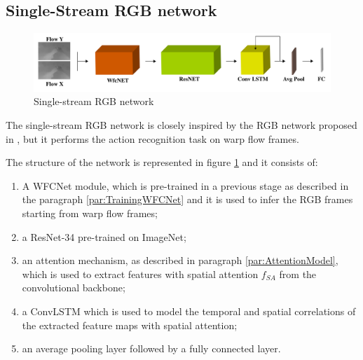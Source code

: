 \documentclass[10pt,twocolumn,letterpaper]{article}
\begin{document}
\subsection{Single-Stream RGB network}

\begin{figure}
	\begin{center}
		\includegraphics[width=\textwidth]{schemi/single_stream.img.pdf}		
	\end{center}
	\caption{Single-stream RGB network}
	\label{fig:SingleStream}
\end{figure}

The single-stream RGB network is closely inspired by the RGB network proposed in \cite{Ego-RNN}, but it performs the action recognition task on warp flow frames.

The structure of the network is represented in figure \ref{fig:SingleStream} and it consists of:
\begin{enumerate}
	\item A WFCNet module, which is pre-trained in a previous stage as described in the paragraph \ref{par:TrainingWFCNet} and it is used to infer the RGB frames starting from warp flow frames;
	\item a ResNet-34 pre-trained on ImageNet;
	\item an attention mechanism, as described in paragraph \ref{par:AttentionModel}, which is used to extract features with spatial attention $f_{SA}$ from the convolutional backbone;
	\item a ConvLSTM which is used to model the temporal and spatial correlations of the extracted feature maps with spatial attention;
	\item an average pooling layer followed by a fully connected layer.
\end{enumerate}
\end{document}
